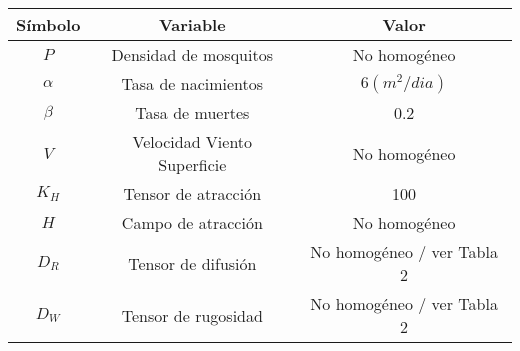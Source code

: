 \begin{center}
	\begin{tabular}{|c | c | c|} 
		\hline
		\textbf{Símbolo} & \textbf{Variable} & \textbf{Valor}\\
		\hline
		$$P$$ & Densidad de mosquitos & No homogéneo \\
		\hline
		$\alpha$  & Tasa de nacimientos & $6 (m^2/dia)$ \\
		\hline
		$\beta$  & Tasa de muertes             & 0.2 \\
		\hline
		$V$   & Velocidad Viento Superficie & No homogéneo \\
		\hline
		$K_H$   & Tensor de atracción         & 100 \\
		\hline
		$H$    & Campo de atracción          & No homogéneo \\
		\hline
		$D_R$   & Tensor de difusión          & No homogéneo / ver Tabla 2 \\
		\hline
		$D_W$   & Tensor de rugosidad         & No homogéneo / ver Tabla 2\\
		\hline
	\end{tabular}
\end{center}


